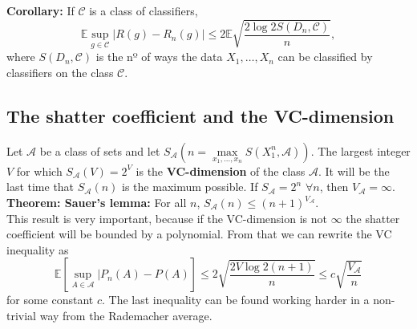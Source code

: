 \documentclass[11pt, english]{article}
\begin{document}
 \textbf{Corollary:} If $\mathcal{C}$ is a class of classifiers, \begin{equation}
 	\mathbb{E}\underset{g\in\mathcal{C}}{\sup}|R(g)-R_n(g)|\leq 2\mathbb{E}\sqrt{\frac{2\log 2S(D_n,\mathcal{C})}{n}},
 \end{equation} where $S(D_n,\mathcal{C})$ is the nº of ways the data $X_1,\dots,X_n$ can be classified by classifiers on the class $\mathcal{C}$.\\
 
\subsection*{The shatter coefficient and the VC-dimension}
Let $\mathcal{A}$ be a class of sets and let $S_{\mathcal{A}}(n=\underset{x_1,\dots,x_n}{\max}S(X_1^n,\mathcal{A}))$. The largest integer $V$ for which $S_{\mathcal{A}}(V)=2^V$ is the \textbf{VC-dimension} of the class $\mathcal{A}$. It will be the last time that $S_{\mathcal{A}}(n)$ is the maximum possible. If $S_{\mathcal{A}}=2^n$ $\forall n$, then $V_{\mathcal{A}}=\infty$.\\
 
\textbf{Theorem: Sauer's lemma:} For all $n$, $S_{\mathcal{A}}(n)\leq (n+1)^{V_{\mathcal{A}}}$.\\
 
This result is very important, because if the VC-dimension is not $\infty$ the shatter coefficient will be bounded by a polynomial. From that we can rewrite the VC inequality as 
\begin{equation}
 	\mathbb{E}[\underset{A\in\mathcal{A}}{\sup}|P_n(A)-P(A)]\leq 2\sqrt{\frac{2V\log 2(n+1)}{n}}\leq c\sqrt{\frac{V_{\mathcal{A}}}{n}}
\end{equation}
for some constant $c$. The last inequality can be found working harder in a non-trivial way from the Rademacher average.\\
\end{document}
